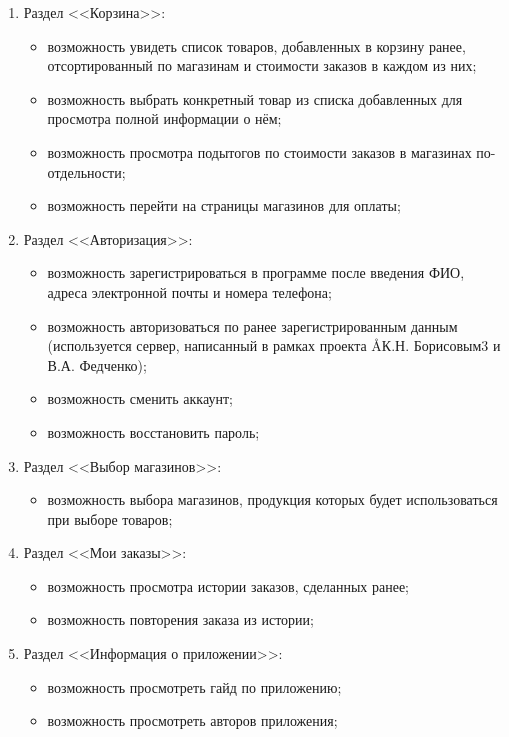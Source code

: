 \documentclass[a4paper,12pt]{article}
\begin{document}
\begin{enumerate}
    \item Раздел <<Корзина>>:
    \begin{itemize}
      \item возможность увидеть список товаров, добавленных в корзину ранее, отсортированный по магазинам и стоимости заказов в каждом из них;
      \item возможность выбрать конкретный товар из списка добавленных для просмотра полной информации о нём;
      \item возможность просмотра подытогов по стоимости заказов в магазинах по-отдельности;
      \item возможность перейти на страницы магазинов для оплаты;
    \end{itemize}
    \item Раздел <<Авторизация>>:
    \begin{itemize}
      \item возможность зарегистрироваться в программе после введения ФИО, адреса электронной почты и номера телефона;
      \item возможность авторизоваться по ранее зарегистрированным данным (используется сервер, написанный в рамках проекта \AA{К.Н. Борисовым}{3} и В.А. Федченко);
      \item возможность сменить аккаунт;
      \item возможность восстановить пароль;
    \end{itemize}
    \item Раздел <<Выбор магазинов>>:
    \begin{itemize}
      \item возможность выбора магазинов, продукция которых будет использоваться при выборе товаров;
    \end{itemize}
    \item Раздел <<Мои заказы>>:
    \begin{itemize}
      \item возможность просмотра истории заказов, сделанных ранее;
      \item возможность повторения заказа из истории;
    \end{itemize}
    \item Раздел <<Информация о приложении>>:
    \begin{itemize}
      \item возможность просмотреть гайд по приложению;
      \item возможность просмотреть авторов приложения;
    \end{itemize}
  \end{enumerate}
\end{document}
